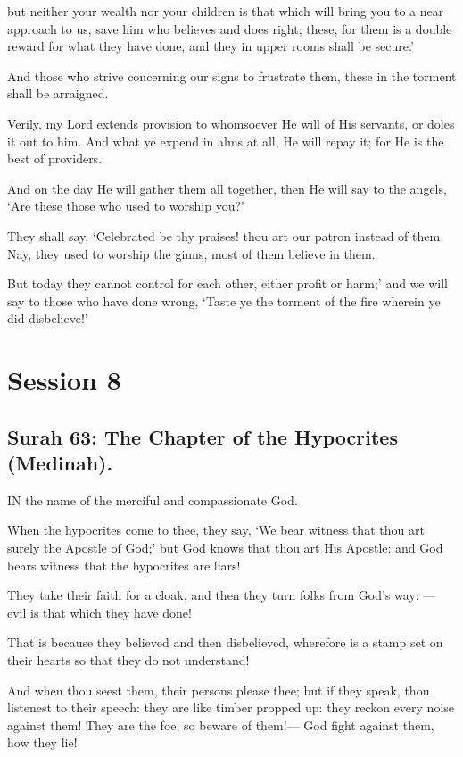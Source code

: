\documentclass[fontsize=14pt, letterpaper, notitlepage, openany, DIV=12]{scrbook} %
\begin{document}
\noindent[34:37]
but neither your wealth nor your children is that which will bring you to a near approach
to us, save him who believes and does right; these, for them is a double reward for what they
have done, and they in upper rooms shall be secure.'

\noindent[34:38]
And those who strive concerning our signs to frustrate them, these in the torment shall be
arraigned.

\noindent[34:39]
Verily, my Lord extends provision to whomsoever He will of His servants, or doles it out
to him. And what ye expend in alms at all, He will repay it; for He is the best of providers.

\noindent[34:40]
And on the day He will gather them all together, then He will say to the angels, `Are
these those who used to worship you?'

\noindent[34:41]
They shall say, `Celebrated be thy praises! thou art our patron instead of them. Nay, they
used to worship the ginns, most of them believe in them.

\noindent[34:42]
But today they cannot control for each other, either profit or harm;' and we will say to
those who have done wrong, `Taste ye the torment of the fire wherein ye did disbelieve!'

\clearpage
\chapter{Session 8}


\section{Surah 63: The Chapter of the Hypocrites (Medinah).}


IN the name of the merciful and compassionate God.

\noindent[63:1]
When the hypocrites come to thee, they say, `We bear witness that thou art surely the
Apostle of God;' but God knows that thou art His Apostle: and God bears witness that the
hypocrites are liars!

\noindent[63:2]
They take their faith for a cloak, and then they turn folks from God's way: --- evil is that
which they have done!

\noindent[63:3]
That is because they believed and then disbelieved, wherefore is a stamp set on their
hearts so that they do not understand!

\noindent[63:4]
And when thou seest them, their persons please thee; but if they speak, thou listenest to
their speech: they are like timber propped up: they reckon every noise against them! They are the
foe, so beware of them!--- God fight against them, how they lie!
\end{document}
